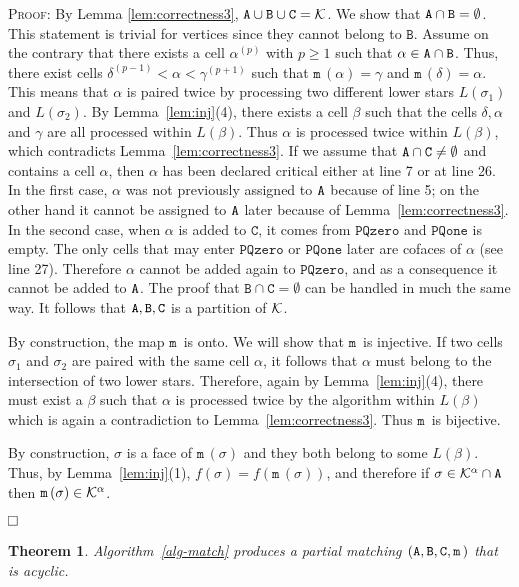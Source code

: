 \documentclass[12pt]{article}
\newtheorem{thm}{Theorem}[section]
\newenvironment{proof}{\noindent\textsc{Proof: }}{\hfill$\fbox{}$\par\medskip\par}
\newcommand{\cK}{{\cal K}}
\newcommand{\ma}{\texttt{m}\,} \newcommand{\re}{\texttt{r}\,}
\newcommand{\sB}{\texttt{B}}
\newcommand{\sC}{\texttt{C}} \newcommand{\sD}{\texttt{D}} \newcommand{\sM}{\texttt{M}} \newcommand{\sL}{\texttt{L}}
\begin{document}
\begin{proof}
By Lemma \ref{lem:correctness3},  $\sA \cup \sB \cup \sC= {\cK}$. We show that $\sA \cap \sB = \emptyset$.
This statement is trivial for vertices since they cannot belong to $\sB$. Assume on the contrary that there exists a cell $\alpha^{(p)}$ with $p \geq 1$ such that
$\alpha \in \sA \cap \sB$. Thus, there exist cells $\delta^{(p-1)} < \alpha < \gamma^{(p+1)}$ such that
$\ma (\alpha) = \gamma $ and $\ma (\delta) = \alpha$. This means that $\alpha$ is paired twice by processing two different lower stars $L(\sigma_1)$ and $L(\sigma_2)$.
By Lemma~\ref{lem:inj}(4), there exists a cell $\beta$ such that the cells $\delta, \alpha$ and $\gamma$ are all processed within $L(\beta)$. Thus $\alpha$ is
processed twice within $L(\beta)$, which contradicts Lemma~\ref{lem:correctness3}.  If we assume that $\sA \cap \sC \neq \emptyset$
and contains a cell $\alpha$, then $\alpha$ has been declared critical either at line 7 or at line 26. In the first case,  $\alpha$ was not previously assigned to $\texttt{A}$
because of line 5; on the other hand it cannot be assigned to $\texttt{A}$ later because of Lemma~\ref{lem:correctness3}. In the second case,  when $\alpha$ is added to $\sC$,
it comes from $\texttt{PQzero}$ and $\texttt{PQone}$ is empty. The only cells that may enter $\texttt{PQzero}$ or $\texttt{PQone}$ later are cofaces of $\alpha$ (see line 27).
Therefore $\alpha$ cannot be added again to $\texttt{PQzero}$, and as a consequence it cannot be added to $\texttt{A}$. The proof that   $ \sB \cap \sC = \emptyset$ can be handled in
much the same way. It follows that $\sA, \sB, \sC$ is a partition of $\cK$.

By construction, the map $\ma$ is onto. We will show that $\ma$ is injective. If two cells $\sigma_1$ and $\sigma_2$ are paired with the same cell $\alpha$, it follows that $\alpha$
must belong to the intersection of two lower stars. Therefore, again by Lemma~\ref{lem:inj}(4), there must exist a $\beta$ such that $\alpha$ is processed twice by the algorithm within
$L(\beta)$ which is again a
contradiction to Lemma~\ref{lem:correctness3}. Thus $\ma$ is bijective.

By construction, $\sigma$ is a face of $\ma (\sigma)$ and they both belong to some $L(\beta)$. Thus, by Lemma~\ref{lem:inj}(1),
$f(\sigma) = f(\ma(\sigma))$, and therefore if $\sigma \in \cK^\alpha \cap \sA$ then $\ma(\sigma)\in \cK^\alpha$.

\end{proof}


\begin{thm}\label{th:acyclicity}
Algorithm~\ref{alg-match} produces a partial matching $(\sA, \sB, \sC, \ma)$ that is acyclic.
\end{thm}
\end{document}
